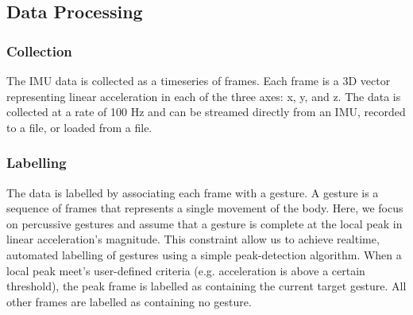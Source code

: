 \documentclass{nime-alternate} %
\begin{document}
\subsection{Data Processing}
\subsubsection{Collection}
The IMU data is collected as a timeseries of frames. Each frame is a 3D vector representing linear acceleration in each of the three axes: x, y, and z. The data is collected at a rate of 100 Hz and can be streamed directly from an IMU, recorded to a file, or loaded from a file.

\subsubsection{Labelling}
The data is labelled by associating each frame with a gesture. A gesture is a sequence of frames that represents a single movement of the body. Here, we focus on percussive gestures and assume that a gesture is complete at the local peak in linear acceleration's magnitude. This constraint allow us to achieve realtime, automated labelling of gestures using a simple peak-detection algorithm. When a local peak meet's user-defined criteria (e.g. acceleration is above a certain threshold), the peak frame is labelled as containing the current target gesture. All other frames are labelled as containing no gesture.
\end{document}
